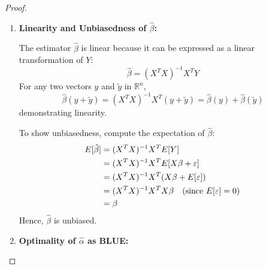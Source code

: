 \documentclass[open=any, 11pt,paper=A4]{scrreprt}
\begin{document}
\begin{proof}
    \begin{enumerate}
        \item \textbf{Linearity and Unbiasedness of \( \hat{\beta} \):}
        
        The estimator \( \hat{\beta} \) is linear because it can be expressed as a linear transformation of \( Y \):
        \[
        \hat{\beta} = (X^T X)^{-1} X^T Y
        \]
        For any two vectors \( y \) and \( \tilde{y} \) in \( \mathbb{R}^n \),
        \[
        \hat{\beta}(y + \tilde{y}) = (X^T X)^{-1} X^T (y + \tilde{y}) = \hat{\beta}(y) + \hat{\beta}(\tilde{y})
        \]
        demonstrating linearity.

        To show unbiasedness, compute the expectation of \( \hat{\beta} \):
        \begin{align*}
            E[\hat{\beta}] &= (X^T X)^{-1} X^T E[Y] \\
            &= (X^T X)^{-1} X^T E[X \beta + \varepsilon] \\
            &= (X^T X)^{-1} X^T (X \beta + E[\varepsilon]) \\
            &= (X^T X)^{-1} X^T X \beta \quad \text{(since \( E[\varepsilon] = 0 \))} \\
            &= \beta
        \end{align*}
        Hence, \( \hat{\beta} \) is unbiased.

        \item \textbf{Optimality of \( \hat{\alpha} \) as BLUE:}


\end{enumerate}
\end{proof}
\end{document}
